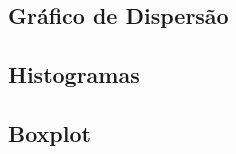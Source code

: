 \documentclass{beamer}
\begin{document}
\subsection{Gráfico de Dispersão}

\subsection{Histogramas}

\subsection{Boxplot}
\end{document}

